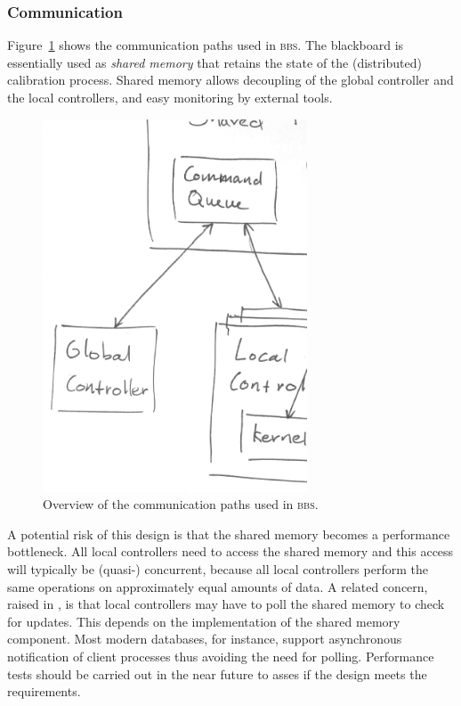 \documentclass[10pt]{lofar}
\newcommand{\bbs}{\textsc{bbs}\xspace}
\begin{document}
\subsubsection{Communication}
\label{subsubsec:distribution-communication}

Figure~\ref{fig:distribution-communication} shows the communication paths used
in \bbs. The blackboard is essentially used as \emph{shared memory} that retains
the state of the (distributed) calibration process. Shared memory allows
decoupling of the global controller and the local controllers, and easy
monitoring by external tools.

\begin{figure}[htb!]
\centering
\includegraphics[width=0.7\textwidth]{images/communication.ps}
\caption{Overview of the communication paths used in \bbs.}
\label{fig:distribution-communication}
\end{figure}

A potential risk of this design is that the shared memory becomes a performance
bottleneck.  All local controllers need to access the shared memory and this
access will typically be (quasi-) concurrent, because all local controllers
perform the same operations on approximately equal amounts of data. A related
concern, raised in \cite[p.19]{LOFAR-ASTRON-SDD-052}, is that local controllers
may have to poll the shared memory to check for updates. This depends on the
implementation of the shared memory component. Most modern databases, for
instance, support asynchronous notification of client processes thus avoiding
the need for polling. Performance tests should be carried out in the near future
to asses if the design meets the requirements.
\end{document}

